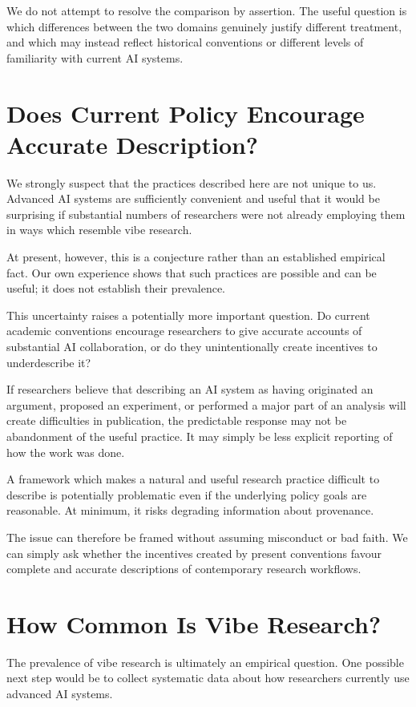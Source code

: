 We do not attempt to resolve the comparison by assertion. The useful question is which differences between the two domains genuinely justify different treatment, and which may instead reflect historical conventions or different levels of familiarity with current AI systems.


\section{Does Current Policy Encourage Accurate Description?}

We strongly suspect that the practices described here are not unique to us. Advanced AI systems are sufficiently convenient and useful that it would be surprising if substantial numbers of researchers were not already employing them in ways which resemble vibe research.

At present, however, this is a conjecture rather than an established empirical fact. Our own experience shows that such practices are possible and can be useful; it does not establish their prevalence.

This uncertainty raises a potentially more important question. Do current academic conventions encourage researchers to give accurate accounts of substantial AI collaboration, or do they unintentionally create incentives to underdescribe it?

If researchers believe that describing an AI system as having originated an argument, proposed an experiment, or performed a major part of an analysis will create difficulties in publication, the predictable response may not be abandonment of the useful practice. It may simply be less explicit reporting of how the work was done.

A framework which makes a natural and useful research practice difficult to describe is potentially problematic even if the underlying policy goals are reasonable. At minimum, it risks degrading information about provenance.

The issue can therefore be framed without assuming misconduct or bad faith. We can simply ask whether the incentives created by present conventions favour complete and accurate descriptions of contemporary research workflows.


\section{How Common Is Vibe Research?}

The prevalence of vibe research is ultimately an empirical question. One possible next step would be to collect systematic data about how researchers currently use advanced AI systems.

